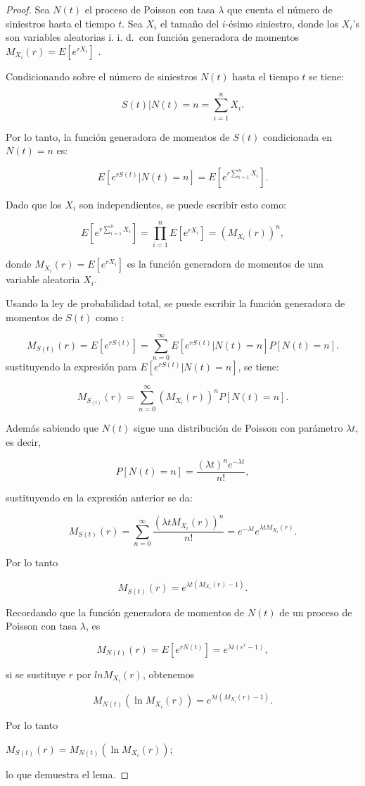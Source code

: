 \documentclass[
  us-letterpaper,
]{scrreprt}
\theoremstyle{plain}
\theoremstyle{plain}
\theoremstyle{definition}
\theoremstyle{remark}
\begin{document}
\begin{proof}
Sea \(N(t)\) el proceso de Poisson con tasa \(\lambda\) que cuenta el
número de siniestros hasta el tiempo \(t\). Sea \(X_i\) el tamaño del
\(i\)-ésimo siniestro, donde los \(X_i\)'s son variables aleatorias i.
i. d.~con función generadora de momentos \(M_{X_i}(r) = E[e^{rX_i}]\) .

Condicionando sobre el número de siniestros \(N(t)\) hasta el tiempo
\(t\) se tiene:

\[S(t)|N(t) = n = \sum_{i=1}^{n} X_i. \]

Por lo tanto, la función generadora de momentos de \(S(t)\) condicionada
en \(N(t) = n\) es:

\[E[e^{rS(t)}| N(t)=n] = E\left[e^{r\sum_{i=1}^n X_i}\right].\]

Dado que los \(X_i\) son independientes, se puede escribir esto como:

\[E\left[e^{r\sum_{i=1}^n X_i}\right]= \prod_{i=1}^n E[e^{rX_i}] = (M_{X_i}(r))^n, \]

donde \(M_{X_i}(r) = E[e^{rX_i}]\) es la función generadora de momentos
de una variable aleatoria \(X_i\).

Usando la ley de probabilidad total, se puede escribir la función
generadora de momentos de \(S(t)\) como :

\[M_{S(t)}(r) = E[e^{rS(t)}] = \sum_{n=0}^{\infty} E[e^{rS(t)}|N(t) = n]P[N(t) =n]. \]
sustituyendo la expresión para \(E[e^{rS(t)}|N(t)=n]\), se tiene:

\[M_{S_(t)}(r) = \sum_{n=0}^{\infty}(M_{X_i}(r))^nP[N(t)=n]. \]

Además sabiendo que \(N(t)\) sigue una distribución de Poisson con
parámetro \(\lambda t\), es decir,

\[P[N(t) = n] = \frac{(\lambda t)^n e^{-\lambda t}}{n!} , \]

sustituyendo en la expresión anterior se da:

\[M_{S(t)}(r) = \sum_{n=0}^{\infty} \frac{(\lambda tM_{X_i}(r))^n}{n!} = e^{-\lambda t}e^{\lambda tM_{X_i}(r)}. \]

Por lo tanto

\[
M_{S(t)}(r) = e^{\lambda t(M_{X_i}(r) -1)}.
\]

Recordando que la función generadora de momentos de \(N(t)\) de un
proceso de Poisson con tasa \(\lambda\), es

\[ M_{N(t)}(r) = E[e^{rN(t)}] = e^{\lambda t(e^r - 1)}, \]

si se sustituye \(r\) por \(ln M_{X_i}(r)\), obtenemos

\[M_{N(t)}(\ln M_{X_i}(r)) = e^{\lambda t (M_{X_i}(r) - 1)}.\]

Por lo tanto

\(M_{S(t)}(r) = M_{N(t)}(\ln M_{X_i}(r));\)

lo que demuestra el lema.
\end{proof}
\end{document}
